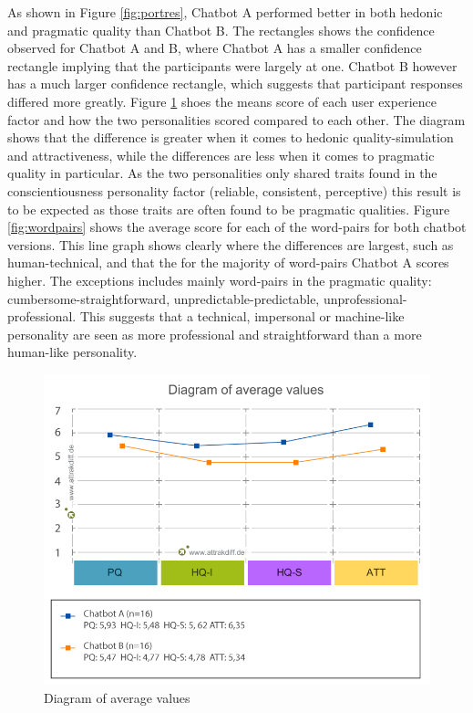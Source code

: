 As shown in Figure \ref{fig:portres}, Chatbot A performed better in both hedonic and pragmatic quality than Chatbot B. The rectangles shows the confidence observed for Chatbot A and B, where Chatbot A has a smaller confidence rectangle implying that the participants were largely at one. Chatbot B however has a much larger confidence rectangle, which suggests that participant responses differed more greatly. Figure \ref{fig:diagval} shoes the means score of each user experience factor and how the two personalities scored compared to each other. The diagram shows that the difference is greater when it comes to hedonic quality-simulation and attractiveness, while the differences are less when it comes to pragmatic quality in particular. As the two personalities only shared traits found in the conscientiousness personality factor (reliable, consistent, perceptive) this result is to be expected as those traits are often found to be pragmatic qualities. Figure \ref{fig:wordpairs} shows the average score for each of the word-pairs for both chatbot versions. This line graph shows clearly where the differences are largest, such as human-technical, and that the for the majority of word-pairs Chatbot A scores higher. The exceptions includes mainly word-pairs in the pragmatic quality: cumbersome-straightforward, unpredictable-predictable, unprofessional-professional. This suggests that a technical, impersonal or machine-like personality are seen as more professional and straightforward than a more human-like personality.

\begin{figure}[h]
    \centering
    \includegraphics[scale=0.5]{figures/Diagram-of-average-values.png}
    \caption{Diagram of average values}
    \label{fig:diagval}
\end{figure}

